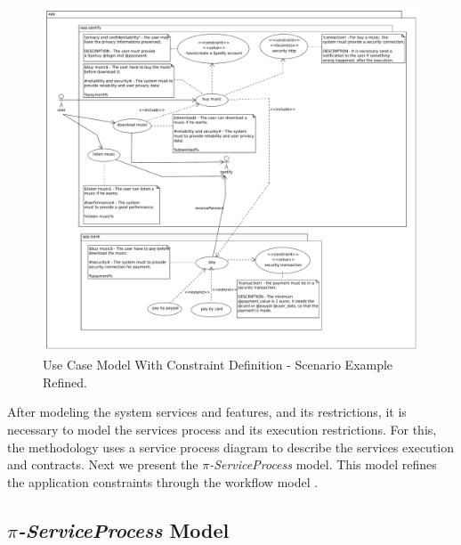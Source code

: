\begin{figure}[ht!]
\centering
\includegraphics[width=.99\textwidth]{chapters/methodology/figs/piusecase/application/packages2.pdf}
\caption{Use Case Model With Constraint Definition - Scenario Example Refined.}
\label{fig:usecaseContraint}
\end{figure}


\bigskip
\bigskip

After modeling the system services and features, and its
restrictions, it is necessary to model the services process and its
execution restrictions. For this, the methodology uses a service process diagram
to describe the services execution and contracts. Next we present the
\textit{$\pi$-ServiceProcess} model. This model refines the application
constraints through the workflow model .

\subsection{\textit{$\pi$-ServiceProcess} Model}


